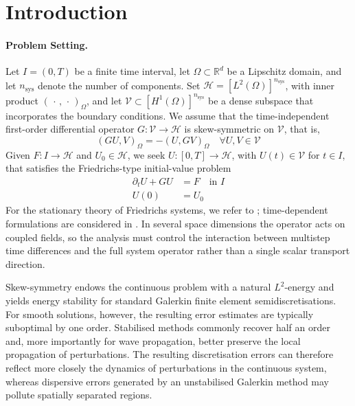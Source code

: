 \documentclass[11pt]{article}
\begin{document}

\section{Introduction}
\label{sec:intro}

\paragraph{Problem Setting.}
Let \(I=(0,T)\) be a finite time interval, let
\(\Omega\subset\mathbb R^d\) be a Lipschitz domain, and let
\(n_{\mathrm{sys}}\) denote the number of components. Set
\(\mathcal H=[L^2(\Omega)]^{n_{\mathrm{sys}}}\), with inner product
\((\,\cdot\,,\,\cdot\,)_{\Omega}\), and let
\(\mathcal V\subset[H^1(\Omega)]^{n_{\mathrm{sys}}}\) be a dense subspace
that incorporates the boundary conditions. We assume that the time-independent
first-order differential operator \(G:\mathcal V\to\mathcal H\) is
skew-symmetric on \(\mathcal V\), that is,
\begin{equation}
(GU,V)_{\Omega}=-(U,GV)_{\Omega}
\quad \forall U,V\in\mathcal V \label{eq:introduction-spatial-operator-skew}
\end{equation}
Given \(F:I\to\mathcal H\) and \(U_0\in\mathcal H\), we seek
\(U:[0,T]\to\mathcal H\), with \(U(t)\in\mathcal V\) for \(t\in I\), that
satisfies the Friedrichs-type initial-value problem
\begin{align}
\partial_tU+GU&=F \quad\text{in }I \label{eq:model}\\
U(0)&=U_0 \label{eq:model-initial-condition}
\end{align}
For the stationary theory of Friedrichs systems, we refer to
\cite{EG06,EGC07}; time-dependent formulations are considered in
\cite{BE16,BH21}.
In several space dimensions the operator acts on coupled fields, so
the analysis must control the interaction between multistep time differences
and the full system operator rather than a single scalar transport
direction.

Skew-symmetry endows the continuous problem with a natural \(L^2\)-energy
and yields energy stability for standard Galerkin finite element
semidiscretisations. For smooth solutions, however, the resulting error
estimates are typically suboptimal by one order. Stabilised methods commonly
recover half an order and, more importantly for wave propagation, better
preserve the local propagation of perturbations. The resulting discretisation
errors can therefore reflect more closely the dynamics of perturbations in the
continuous system, whereas dispersive errors generated by an unstabilised
Galerkin method may pollute spatially separated regions.
\end{document}
